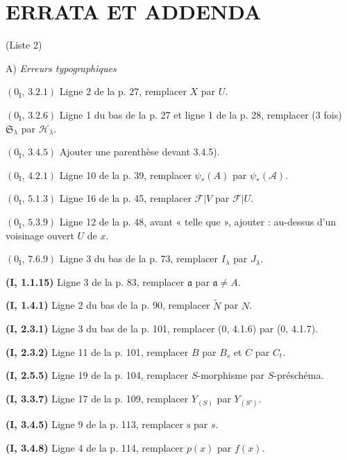 \section*{ERRATA ET ADDENDA}
\begin{center}
(Liste 2)

\medskip
A) \emph{Erreurs typographiques}
\end{center}

\noindent\textbf{$(0_{\mathrm I},\,3.2.1)$} Ligne 2 de la p. 27, remplacer $X$
par $U$.

\noindent\textbf{$(0_{\mathrm I},\,3.2.6)$} Ligne 1 du bas de la p. 27 et ligne
1 de la p. 28, remplacer (3 fois) $\mathfrak S_\lambda$ par
$\mathscr H_\lambda$.

\noindent\textbf{$(0_{\mathrm I},\,3.4.5)$} Ajouter une parenthèse devant
3.4.5).

\noindent\textbf{$(0_{\mathrm I},\,4.2.1)$} Ligne 10 de la p. 39, remplacer
$\psi_*(A)$ par $\psi_*(\mathscr A)$.

\noindent\textbf{$(0_{\mathrm I},\,5.1.3)$} Ligne 16 de la p. 45, remplacer
$\mathscr F|V$ par $\mathscr F|U$.

\noindent\textbf{$(0_{\mathrm I},\,5.3.9)$} Ligne 12 de la p. 48, avant
« telle que », ajouter : au-dessus d'un voisinage ouvert $U$ de $x$.

\noindent\textbf{$(0_{\mathrm I},\,7.6.9)$} Ligne 3 du bas de la p. 73,
remplacer $I_\lambda$ par $J_\lambda$.

\noindent\textbf{(I, 1.1.15)} Ligne 3 de la p. 83, remplacer $\mathfrak a$ par
$\mathfrak a\ne A$.

\noindent\textbf{(I, 1.4.1)} Ligne 2 du bas de la p. 90, remplacer
$\widetilde N$ par $N$.

\noindent\textbf{(I, 2.3.1)} Ligne 3 du bas de la p. 101, remplacer (0, 4.1.6)
par (0, 4.1.7).

\noindent\textbf{(I, 2.3.2)} Ligne 11 de la p. 101, remplacer $B$ par $B_s$ et
$C$ par $C_t$.

\noindent\textbf{(I, 2.5.5)} Ligne 19 de la p. 104, remplacer $S$-morphisme
par $S$-préschéma.

\noindent\textbf{(I, 3.3.7)} Ligne 17 de la p. 109, remplacer $Y_{(S)}$ par
$Y_{(S')}$.

\noindent\textbf{(I, 3.4.5)} Ligne 9 de la p. 113, remplacer $\mathrm s$ par
$s$.

\noindent\textbf{(I, 3.4.8)} Ligne 4 de la p. 114, remplacer $p(x)$ par
$f(x)$.

